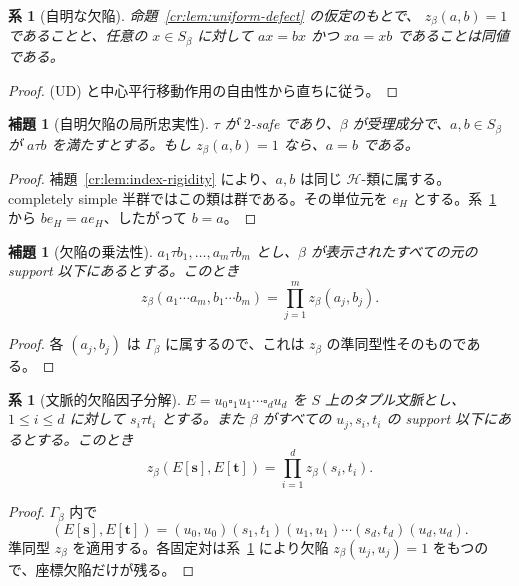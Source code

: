 \documentclass[10pt,a4paper]{ltjsarticle}
\newtheorem{lemma}[theorem]{補題}
\newtheorem{corollary}[theorem]{系}
\theoremstyle{definition}
\theoremstyle{remark}
\newcommand{\blank}{\square}
\begin{document}
\begin{corollary}[自明な欠陥]
\label{cr:cor:trivial-defect}
命題~\ref{cr:lem:uniform-defect} の仮定のもとで、
\(z_\beta(a,b)=1\)
であることと、任意の $x\in S_\beta$ に対して
\(ax=bx\) かつ \(xa=xb\)
であることは同値である。
\end{corollary}

\begin{proof}
\textup{(UD)} と中心平行移動作用の自由性から直ちに従う。
\end{proof}

\begin{lemma}[自明欠陥の局所忠実性]
\label{cr:lem:local-faithfulness}
$\tau$ が $2$-safe であり、$\beta$ が受理成分で、$a,b\in S_\beta$ が $a\tau b$ を満たすとする。もし $z_\beta(a,b)=1$ なら、$a=b$ である。
\end{lemma}

\begin{proof}
補題~\ref{cr:lem:index-rigidity} により、$a,b$ は同じ $\mathcal H$-類に属する。completely simple 半群ではこの類は群である。その単位元を $e_H$ とする。系~\ref{cr:cor:trivial-defect} から
$be_H=ae_H$、したがって $b=a$。
\end{proof}

\begin{lemma}[欠陥の乗法性]
\label{cr:lem:defect-product}
\(a_1\tau b_1,\ldots,a_m\tau b_m\) とし、\(\beta\) が表示されたすべての元の support 以下にあるとする。このとき
\[
z_\beta(a_1\cdots a_m,b_1\cdots b_m)
=\prod_{j=1}^m z_\beta(a_j,b_j).
\]
\end{lemma}

\begin{proof}
各 $(a_j,b_j)$ は \(\Gamma_\beta\) に属するので、これは $z_\beta$ の準同型性そのものである。
\end{proof}

\begin{corollary}[文脈的欠陥因子分解]
\label{cr:cor:context-defect}
\(E=u_0\blank_1u_1\cdots\blank_du_d\) を $S$ 上のタプル文脈とし、$1\le i\le d$ に対して $s_i\tau t_i$ とする。また \(\beta\) がすべての $u_j,s_i,t_i$ の support 以下にあるとする。このとき
\[
z_\beta(E[\mathbf s],E[\mathbf t])
=\prod_{i=1}^d z_\beta(s_i,t_i).
\tag{CD}
\]
\end{corollary}

\begin{proof}
\(\Gamma_\beta\) 内で
\[
(E[\mathbf s],E[\mathbf t])
=(u_0,u_0)(s_1,t_1)(u_1,u_1)\cdots(s_d,t_d)(u_d,u_d).
\]
準同型 $z_\beta$ を適用する。各固定対は系~\ref{cr:cor:trivial-defect} により欠陥 $z_\beta(u_j,u_j)=1$ をもつので、座標欠陥だけが残る。
\end{proof}
\end{document}
